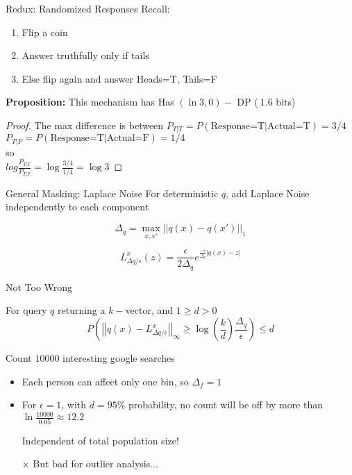 \documentclass{beamer}
\begin{document}
\begin{frame}{Redux: Randomized Responses}
  Recall:
  \begin{enumerate}
    \item Flip a coin
    \item Answer truthfully only if tails
    \item Else flip again and answer Heads=T, Tails=F
  \end{enumerate}
  {\bf Proposition:} This mechanism has Has $(\ln{3},0)-$ DP ($~1.6$ bits)
\begin{proof}
  The max difference is between
  \center $P_{T|T} = P(\mbox{Response=T} | \mbox{Actual=T}) = 3/4$
  \center $P_{T|F} = P(\mbox{Response=T} | \mbox{Actual=F}) = 1/4$\\
so\\
$log{\frac{P_{T|T}}{P_{T|F}}} = \log{\frac{3/4}{1/4}} = \log{3}$
\end{proof}
\end{frame}

\begin{frame}{General Masking: Laplace Noise}
  For deterministic $q$, add Laplace Noise independently to each component
  \begin{definition}[L1-sensitivity]
    \[\Delta_q = \max_{x,x'} ||q(x) - q(x')||_1\]
  \end{definition}
  \begin{definition}
  \[  L^x_{\Delta q/\epsilon}(z) = \frac{\epsilon}{2\Delta_q} e^{\frac{-\epsilon}{\Delta_q}|q(x)-z|}\]
  \end{definition}
\end{frame}

\begin{frame}{Not Too Wrong}
  \begin{block}{For query $q$ returning a $k-$vector, and $1 \geq d > 0$}
    \[P\left(\left|\left|q(x)-L^x_{\Delta q/\epsilon}\right|\right|_{\infty} \geq \log{\left(\frac{k}{d}\right)}\frac{\Delta_q}{\epsilon}\right) \leq d\]
  \end{block}
  \begin{example}{Count $10000$ interesting google searches}
    \begin{itemize}
      \item Each person can affect only one bin, so $\Delta_f=1$
      \item For $\epsilon=1$, with $d=95\%$ probability, no count will be off by more than $\ln{\frac{10000}{0.05} \approx 12.2}$
      \item[\checkmark] Independent of total population size!
      \item[$\times$] But bad for outlier analysis...
    \end{itemize}
  \end{example}
\end{frame}
\end{document}
